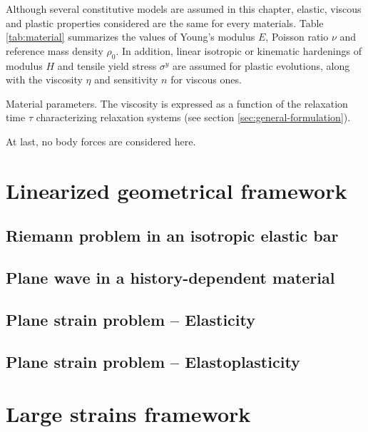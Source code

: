 Although several constitutive models are assumed in this chapter, elastic, viscous and plastic properties considered are the same for every materials. Table \ref{tab:material} summarizes the values of Young's modulus $E$, Poisson ratio $\nu$ and reference mass density $\rho_0$.
In addition, linear isotropic or kinematic hardenings of modulus $H$ and tensile yield stress $\sigma^y$ are assumed for plastic evolutions, along with the viscosity $\eta$ and sensitivity $n$ for viscous ones.
\begin{table}[h!]
  \centering
  
  \caption{Material parameters. The viscosity is expressed as a function of the relaxation time $\tau$ characterizing relaxation systems (see section \ref{sec:general-formulation}).}
  \label{tab:material}
\end{table}
At last, no body forces are considered here.
\section{Linearized geometrical framework}
\label{sec:hpp_simulations}

\subsection{Riemann problem in an isotropic elastic bar}
\label{subsec:hpp_bar}


\subsection{Plane wave in a history-dependent material}
\label{subsec:hpp_planewave}


\subsection{Plane strain problem -- Elasticity}
\label{subsec:el_planestrain}


\subsection{Plane strain problem -- Elastoplasticity}
\label{subsec:ep_planestrain}


\section{Large strains framework}
\label{sec:he_simulations}
